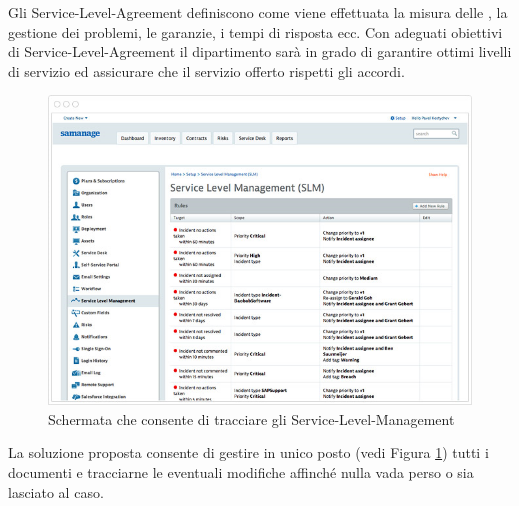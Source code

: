 Gli \ac{Service-Level-Agreement} definiscono come viene effettuata la misura delle , la gestione dei problemi, le garanzie, i tempi di risposta ecc. Con adeguati obiettivi di \ac{Service-Level-Agreement} il dipartimento sarà in grado di garantire ottimi livelli di servizio ed assicurare che il servizio offerto rispetti gli accordi.

\begin{figure}[htbp]
\centering
\includegraphics[scale=0.6]{Images/samanage/Service_level_management.png}
\caption{Schermata che consente di tracciare gli \ac{Service-Level-Management}}
\label{sd-tools-sla-img}
\end{figure}

La soluzione proposta consente di gestire in unico posto (vedi Figura \ref{sd-tools-sla-img}) tutti i documenti e tracciarne le eventuali modifiche affinché nulla vada perso o sia lasciato al caso.